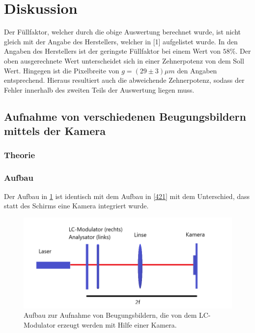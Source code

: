 \section{Diskussion}
Der Füllfaktor, welcher durch die obige Auswertung berechnet wurde, ist nicht gleich mit der Angabe des Herstellers, welcher in [1] aufgelistet wurde. In den Angaben des Herstellers ist der geringste Füllfaktor bei einem Wert von $58 \%$. Der oben ausgerechnete Wert unterscheidet sich in einer Zehnerpotenz von dem Soll Wert. Hingegen ist die Pixelbreite von $g = (29 \pm 3) \mu m$ den Angaben entsprechend. Hieraus resultiert auch die abweichende Zehnerpotenz, sodass der Fehler innerhalb des zweiten Teils der Auswertung liegen muss.

\subsection{Aufnahme von verschiedenen Beugungsbildern mittels der Kamera}
\subsubsection{Theorie}
\subsubsection{Aufbau}
Der Aufbau in \cref{423} ist identisch mit dem Aufbau in \cref{421} mit dem Unterschied, dass statt des Schirms eine Kamera integriert wurde.
\begin{figure}[h!]
	\centering
	\includegraphics[scale = 1]{Kamera111.png}
	\caption{Aufbau zur Aufnahme von Beugungsbildern, die von dem LC-Modulator erzeugt werden mit Hilfe einer Kamera.}
	\label{423}
\end{figure}
